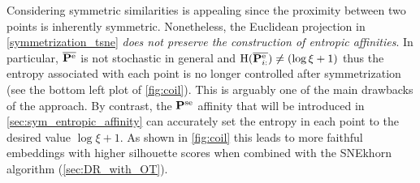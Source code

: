 Considering symmetric similarities is appealing since the proximity between two
points is inherently symmetric. Nonetheless, the Euclidean projection in
\eqref{symmetrization_tsne} \emph{does not preserve the construction of entropic
affinities}.  In particular, $\overline{\mathbf{P}^{\mathrm{e}}}$ is not stochastic in
general and $\operatorname{H}(\overline{\mathbf{P}_{i:}^{\mathrm{e}}}) \neq (\log{\xi} + 1)$ thus the entropy associated with each point is no longer controlled after symmetrization (see the bottom left plot of \cref{fig:coil}). This is
arguably one of the main drawbacks of the approach. By contrast, the
$\mathbf{P}^{\mathrm{se}}$ affinity that will be introduced in \cref{sec:sym_entropic_affinity} can
accurately set the entropy in each point to the desired value $\log \xi + 1$.  As shown in \cref{fig:coil} this leads to more faithful embeddings with higher silhouette scores when combined with the SNEkhorn algorithm (\cref{sec:DR_with_OT}).

